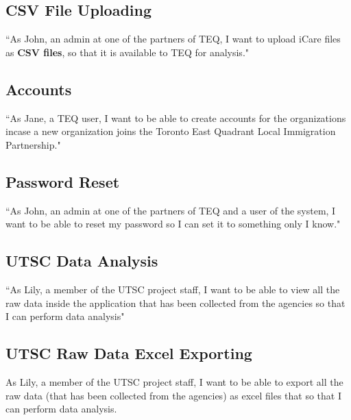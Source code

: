 \documentclass[12pt]{article}
\begin{document}
\subsection{CSV File Uploading}
``As John, an admin at one of the partners of TEQ, I want to upload iCare files as \textbf{CSV files}, so that it is available to TEQ for analysis."

\subsection{Accounts} ``As Jane, a TEQ user, I want to be able to create accounts for the organizations incase a new organization joins the Toronto East Quadrant Local Immigration Partnership."

\subsection{Password Reset}
``As John, an admin at one of the partners of TEQ and a user of the system, I want to be able to reset my password so I can set it to something only I know."

\subsection{UTSC Data Analysis}
``As Lily, a member of the UTSC project staff, I want to be able to view all the raw data inside the application that has been collected from the agencies so that I can perform data analysis" 

\subsection{UTSC Raw Data Excel Exporting }
As Lily, a member of the UTSC project staff, I want to be able to export all the raw data (that has been collected from the agencies) as excel files that so that I can perform data analysis. 

\newpage


\end{document}
